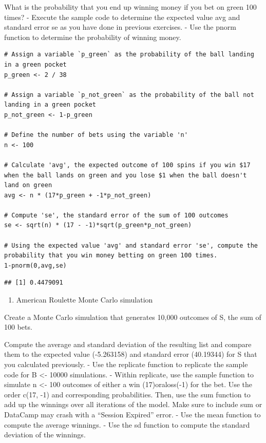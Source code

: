 \documentclass[
]{article}
\providecommand{\tightlist}{%
  \setlength{\itemsep}{0pt}\setlength{\parskip}{0pt}}
\begin{document}
What is the probability that you end up winning money if you bet on
green 100 times? - Execute the sample code to determine the expected
value avg and standard error se as you have done in previous exercises.
- Use the pnorm function to determine the probability of winning money.

\begin{verbatim}
# Assign a variable `p_green` as the probability of the ball landing in a green pocket
p_green <- 2 / 38

# Assign a variable `p_not_green` as the probability of the ball not landing in a green pocket
p_not_green <- 1-p_green

# Define the number of bets using the variable 'n'
n <- 100

# Calculate 'avg', the expected outcome of 100 spins if you win $17 when the ball lands on green and you lose $1 when the ball doesn't land on green
avg <- n * (17*p_green + -1*p_not_green)

# Compute 'se', the standard error of the sum of 100 outcomes
se <- sqrt(n) * (17 - -1)*sqrt(p_green*p_not_green)

# Using the expected value 'avg' and standard error 'se', compute the probability that you win money betting on green 100 times.
1-pnorm(0,avg,se)
\end{verbatim}

\begin{verbatim}
## [1] 0.4479091
\end{verbatim}

\begin{enumerate}
\def\labelenumi{\arabic{enumi}.}
\setcounter{enumi}{1}
\tightlist
\item
  American Roulette Monte Carlo simulation
\end{enumerate}

Create a Monte Carlo simulation that generates 10,000 outcomes of S, the
sum of 100 bets.

Compute the average and standard deviation of the resulting list and
compare them to the expected value (-5.263158) and standard error
(40.19344) for S that you calculated previously. - Use the replicate
function to replicate the sample code for B \textless- 10000
simulations. - Within replicate, use the sample function to simulate n
\textless- 100 outcomes of either a win (17)oraloss(-1) for the bet. Use
the order c(17, -1) and corresponding probabilities. Then, use the sum
function to add up the winnings over all iterations of the model. Make
sure to include sum or DataCamp may crash with a ``Session Expired''
error. - Use the mean function to compute the average winnings. - Use
the sd function to compute the standard deviation of the winnings.
\end{document}
